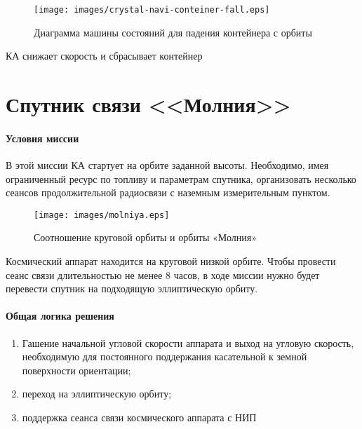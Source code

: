 \documentclass[12pt,a4paper]{article}
\begin{document}
\begin{figure}[tbh]
  \begin{center}
    \texttt{[image: images/crystal-navi-conteiner-fall.eps]}
    \caption{Диаграмма машины состояний для падения контейнера с орбиты}
    \label{Pic:Сrystal-navi-conteinre-fall}
  \end{center}
\end{figure}

КА снижает скорость и сбрасывает контейнер

\section{Спутник связи <<Молния>>}

\paragraph{Условия миссии} В этой миссии КА стартует на орбите
заданной высоты. Необходимо, имея ограниченный ресурс по топливу и параметрам спутника, организовать несколько сеансов продолжительной радиосвязи с наземным измерительным пунктом.

\begin{figure}[tbh]
  \begin{center}
    \texttt{[image: images/molniya.eps]}
    \caption{Соотношение круговой орбиты и орбиты «Молния»}
    \label{Pic:Molniya}
  \end{center}
\end{figure}

Космический аппарат находится на круговой низкой орбите. Чтобы провести сеанс связи длительностью не менее 8 часов, в ходе миссии нужно будет перевести спутник на подходящую эллиптическую
орбиту.

\clearpage
\paragraph{Общая логика решения} 

\begin{enumerate}
\item Гашение начальной угловой скорости аппарата и выход на угловую скорость, необходимую для постоянного поддержания касательной к земной поверхности ориентации;
\item переход на эллиптическую орбиту;
\item поддержка сеанса связи космического аппарата с НИП
\end{enumerate}
\end{document}
